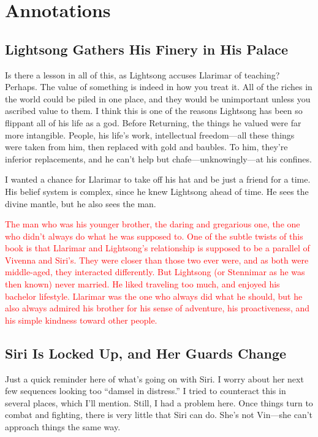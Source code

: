 \section*{Annotations}

\subsection*{Lightsong Gathers His Finery in His Palace}

Is there a lesson in all of this, as Lightsong accuses Llarimar of teaching? Perhaps. The value of something is indeed in how you treat it. All of the riches in the world could be piled in one place, and they would be unimportant unless you ascribed value to them. I think this is one of the reasons Lightsong has been so flippant all of his life as a god. Before Returning, the things he valued were far more intangible. People, his life’s work, intellectual freedom—all these things were taken from him, then replaced with gold and baubles. To him, they’re inferior replacements, and he can’t help but chafe—unknowingly—at his confines.

I wanted a chance for Llarimar to take off his hat and be just a friend for a time. His belief system is complex, since he knew Lightsong ahead of time. He sees the divine mantle, but he also sees the man.

\textcolor{red}{
The man who was his younger brother, the daring and gregarious one, the one who didn’t always do what he was supposed to. One of the subtle twists of this book is that Llarimar and Lightsong’s relationship is supposed to be a parallel of Vivenna and Siri’s. They were closer than those two ever were, and as both were middle-aged, they interacted differently. But Lightsong (or Stennimar as he was then known) never married. He liked traveling too much, and enjoyed his bachelor lifestyle. Llarimar was the one who always did what he should, but he also always admired his brother for his sense of adventure, his proactiveness, and his simple kindness toward other people.
}

\subsection*{Siri Is Locked Up, and Her Guards Change}

Just a quick reminder here of what’s going on with Siri. I worry about her next few sequences looking too “damsel in distress.” I tried to counteract this in several places, which I’ll mention. Still, I had a problem here. Once things turn to combat and fighting, there is very little that Siri can do. She’s not Vin—she can’t approach things the same way.

